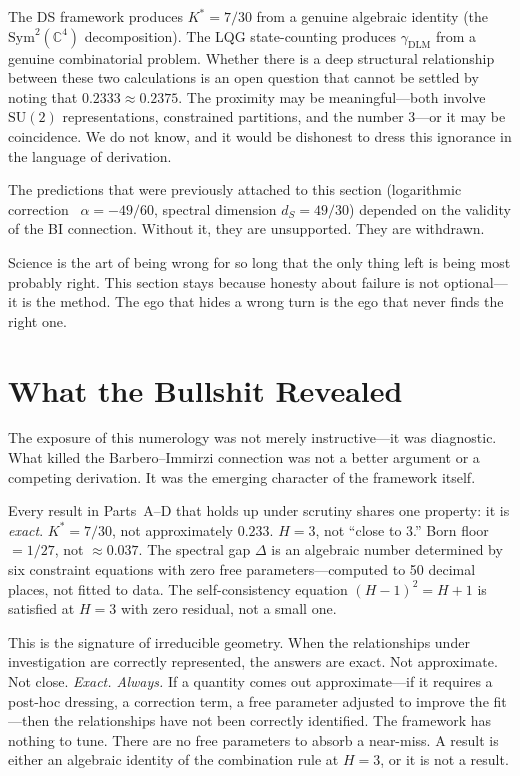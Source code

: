 \documentclass[11pt,a4paper]{article}
\theoremstyle{definition}
\theoremstyle{remark}
\newcommand{\C}{\mathbb{C}}
\newcommand{\SU}{\mathrm{SU}}
\begin{document}
The DS framework produces $K^*=7/30$ from a genuine algebraic identity (the $\mathrm{Sym}^2(\C^4)$ decomposition). The LQG state-counting produces $\gamma_{\mathrm{DLM}}$ from a genuine combinatorial problem. Whether there is a deep structural relationship between these two calculations is an open question that cannot be settled by noting that $0.2333\approx 0.2375$. The proximity may be meaningful---both involve $\SU(2)$ representations, constrained partitions, and the number $3$---or it may be coincidence. We do not know, and it would be dishonest to dress this ignorance in the language of derivation.

The predictions that were previously attached to this section (logarithmic correction~\cite{KM2000} $\alpha=-49/60$, spectral dimension $d_S=49/30$) depended on the validity of the BI connection. Without it, they are unsupported. They are withdrawn.

Science is the art of being wrong for so long that the only thing left is being most probably right. This section stays because honesty about failure is not optional---it is the method. The ego that hides a wrong turn is the ego that never finds the right one.

\section{What the Bullshit Revealed}\label{sec:whatitrevealed}

The exposure of this numerology was not merely instructive---it was diagnostic. What killed the Barbero--Immirzi connection was not a better argument or a competing derivation. It was the emerging character of the framework itself.

Every result in Parts~A--D that holds up under scrutiny shares one property: it is \emph{exact}. $K^*=7/30$, not approximately $0.233$. $H=3$, not ``close to $3$.'' Born floor $=1/27$, not $\approx 0.037$. The spectral gap $\Delta$ is an algebraic number determined by six constraint equations with zero free parameters---computed to 50 decimal places, not fitted to data. The self-consistency equation $(H-1)^2=H+1$ is satisfied at $H=3$ with zero residual, not a small one.

This is the signature of irreducible geometry. When the relationships under investigation are correctly represented, the answers are exact. Not approximate. Not close. \emph{Exact. Always.} If a quantity comes out approximate---if it requires a post-hoc dressing, a correction term, a free parameter adjusted to improve the fit---then the relationships have not been correctly identified. The framework has nothing to tune. There are no free parameters to absorb a near-miss. A result is either an algebraic identity of the combination rule at $H=3$, or it is not a result.
\end{document}
